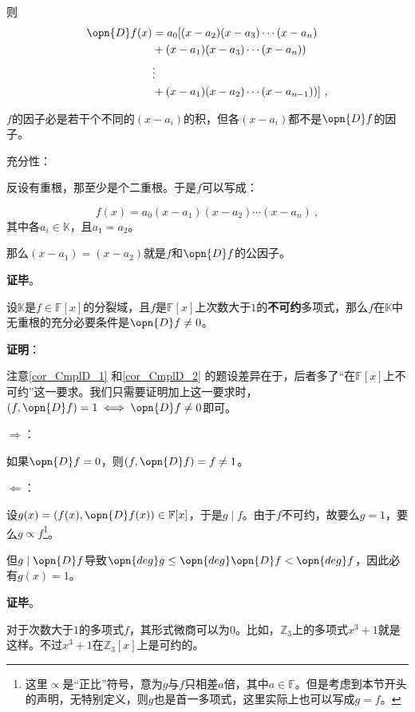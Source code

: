 则
\begin{equation}
\begin{aligned}
\opn{D}f(x) &= a_0[(x-a_2)(x-a_3)\cdots(x-a_n)\\
&+(x-a_1)(x-a_3)\cdots(x-a_n))\\
&\vdots\\
&+(x-a_1)(x-a_2)\cdots(x-a_{n-1}))
]~,
\end{aligned}
\end{equation}

$f$的因子必是若干个不同的$(x-a_i)$的积，但各$(x-a_i)$都不是$\opn{D}f$的因子。

充分性：

反设有重根，那至少是个二重根。于是$f$可以写成：

\begin{equation}
f(x) = a_0(x-a_1)(x-a_2)\cdots(x-a_n)~,
\end{equation}
其中各$a_i\in\mathbb{K}$，且$a_1=a_2$。

那么$(x-a_1)=(x-a_2)$就是$f$和$\opn{D}f$的公因子。

\textbf{证毕}。



\begin{corollary}{}\label{cor_CmplD_2}
设$\mathbb{K}$是$f\in\mathbb{F}[x]$的分裂域，且$f$是$\mathbb{F}[x]$上次数大于$1$的\textbf{不可约}多项式，那么$f$在$\mathbb{K}$中无重根的充分必要条件是$\opn{D}f \neq 0$。
\end{corollary}

\textbf{证明}：

注意\autoref{cor_CmplD_1} 和\autoref{cor_CmplD_2} 的题设差异在于，后者多了“在$\mathbb{F}[x]$上不可约”这一要求。我们只需要证明加上这一要求时，$(f, \opn{D}f)=1 \iff \opn{D}f\neq 0$即可。

$\Rightarrow$：

如果$\opn{D}f=0$，则$(f, \opn{D}f)=f\neq 1$。

$\Leftarrow$：

设$g(x)=(f(x), \opn{D}f(x))\in\mathbb{F}[x]$，于是$g\mid f$。由于$f$不可约，故要么$g=1$，要么$g\propto f$\footnote{这里$\propto$是“正比”符号，意为$g$与$f$只相差$a$倍，其中$a\in\mathbb{F}$。但是考虑到本节开头的声明，无特别定义，则$g$也是首一多项式，这里实际上也可以写成$g=f$。}。

但$g\mid \opn{D}f$导致$\opn{deg}g\leq\opn{deg}\opn{D}f<\opn{deg}f$，因此必有$g(x)=1$。



\textbf{证毕}。

对于次数大于$1$的多项式$f$，其形式微商可以为$0$。比如，$\mathbb{Z}_3$上的多项式$x^3+1$就是这样。不过$x^3+1$在$\mathbb{Z}_3[x]$上是可约的。

